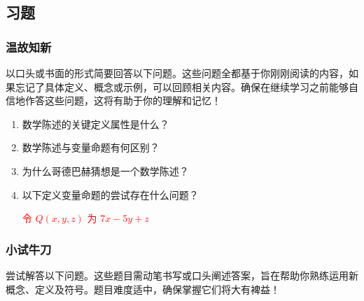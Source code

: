 \subsection{习题}

\subsubsection*{温故知新}

以口头或书面的形式简要回答以下问题。这些问题全都基于你刚刚阅读的内容，如果忘记了具体定义、概念或示例，可以回顾相关内容。确保在继续学习之前能够自信地作答这些问题，这将有助于你的理解和记忆！

\begin{enumerate}[label=(\arabic*)]
    \item 数学陈述的关键定义属性是什么？
    \item 数学陈述与变量命题有何区别？
    \item 为什么哥德巴赫猜想是一个数学陈述？
    \item 以下定义变量命题的尝试存在什么问题？
        \begin{center}
            \textcolor{red}{令 $Q(x, y, z)$ 为 $7x - 5y + z$}
        \end{center}
\end{enumerate}

\subsubsection*{小试牛刀}

尝试解答以下问题。这些题目需动笔书写或口头阐述答案，旨在帮助你熟练运用新概念、定义及符号。题目难度适中，确保掌握它们将大有裨益！

